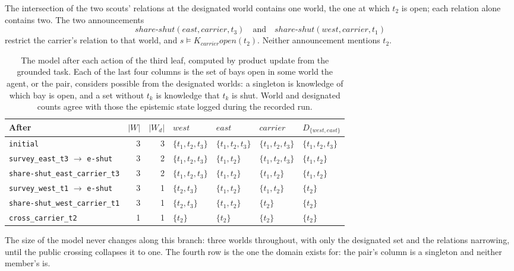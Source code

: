 \documentclass[11pt,a4paper]{article}
\theoremstyle{definition}
\newcommand{\Kop}[1]{K_{#1}}
\newcommand{\code}[1]{\texttt{\small #1}}
\newcommand{\ag}[1]{\mathit{#1}}
\newcommand{\op}{\mathit{open}}
\begin{document}
The intersection of the two scouts' relations at the designated world contains
one world, the one at which $t_2$ is open; each relation alone contains two.
The two announcements
\[
  \mathit{share\text{-}shut}(\ag{east}, \ag{carrier}, t_3)
  \quad\text{and}\quad
  \mathit{share\text{-}shut}(\ag{west}, \ag{carrier}, t_1)
\]
restrict the carrier's relation to that world, and
$s \models \Kop{\ag{carrier}}\op(t_2)$. Neither announcement mentions $t_2$.


\begin{table}[H]
\centering\footnotesize
\caption{The model after each action of the third leaf, computed by product
update from the grounded task. Each of the last four columns is the set of bays
open in some world the agent, or the pair, considers possible from the
designated worlds: a singleton is knowledge of which bay is open, and a set
without $t_k$ is knowledge that $t_k$ is shut. World and designated counts
agree with those the epistemic state logged during the recorded run.}
\label{tab:models}
\setlength{\tabcolsep}{4pt}
\begin{tabular}{@{}lrrllll@{}}
\toprule
\textbf{After} & $|W|$ & $|W_d|$ & $\ag{west}$ & $\ag{east}$ & $\ag{carrier}$ & $D_{\{\ag{west},\ag{east}\}}$ \\
\midrule
\code{initial} & 3 & 3 & $\{t_1, t_2, t_3\}$ & $\{t_1, t_2, t_3\}$ & $\{t_1, t_2, t_3\}$ & $\{t_1, t_2, t_3\}$ \\
\code{survey\_east\_t3} $\to$ \code{e-shut} & 3 & 2 & $\{t_1, t_2, t_3\}$ & $\{t_1, t_2\}$ & $\{t_1, t_2, t_3\}$ & $\{t_1, t_2\}$ \\
\code{share-shut\_east\_carrier\_t3} & 3 & 2 & $\{t_1, t_2, t_3\}$ & $\{t_1, t_2\}$ & $\{t_1, t_2\}$ & $\{t_1, t_2\}$ \\
\code{survey\_west\_t1} $\to$ \code{e-shut} & 3 & 1 & $\{t_2, t_3\}$ & $\{t_1, t_2\}$ & $\{t_1, t_2\}$ & $\{t_2\}$ \\
\code{share-shut\_west\_carrier\_t1} & 3 & 1 & $\{t_2, t_3\}$ & $\{t_1, t_2\}$ & $\{t_2\}$ & $\{t_2\}$ \\
\code{cross\_carrier\_t2} & 1 & 1 & $\{t_2\}$ & $\{t_2\}$ & $\{t_2\}$ & $\{t_2\}$ \\
\bottomrule
\end{tabular}
\end{table}

\noindent
The size of the model never changes along this branch: three worlds
throughout, with only the designated set and the relations narrowing, until the
public crossing collapses it to one. The fourth row is the one the domain
exists for: the pair's column is a singleton and neither member's is.
\end{document}

